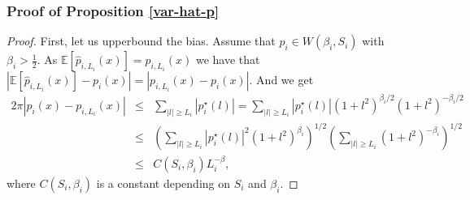 \documentclass[11pt,a4paper,openany]{article}
\def\E{\mathbb{E}}
\begin{document}
\subsubsection{Proof of Proposition \ref{var-hat-p}} \label{preuve-proposition-CC}  
\begin{proof} 

First, let us upperbound the bias.
Assume that $p_i \in W(\beta_i, S_i)$ with $\beta_i > \frac 1 2$.  As $\E[\hat p_{i, L_i}(x)]=p_{i, L_i}(x)$ we have that  $| \E[\hat p_{i, L_i}(x) ]- p_i(x) | =|  p_{i, L_i}(x) - p_i(x)|$. And we get
\begin{eqnarray*}
2\pi | p_i(x) -p_{i, L_i}(x)| &\leq& \sum_{|l| \geq L_i} |p_i^\star(l)| =  \sum_{|l| \geq L_i} |p_i^\star(l)|(1+l^2)^{\beta_i/2}(1+l^2)^{-\beta_i/2} \\
& \leq & (\sum_{|l| \geq L_i}   |p_i^\star(l)|^2(1+l^2)^{\beta_i})^{1/2} (\sum_{|l| \geq L_i}   (1+l^2)^{-\beta_i})^{1/2} \\
& \leq &  C(S_i,\beta_i) L_i^{-\beta},
\end{eqnarray*}
where $C(S_i, \beta_i)$ is a constant depending on $S_i$ and $\beta_i$. 
\medskip


\end{proof}
\end{document}
